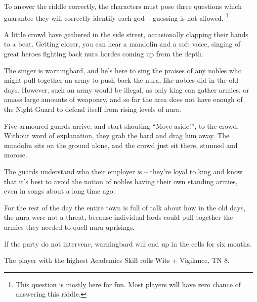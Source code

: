 \begin{multicols}{2}
To answer the riddle correctly, the characters must pose three questions which guarantee they will correctly identify each god -- guessing is not allowed.
\footnote{This question is mostly here for fun.  Most players will have zero chance of answering this riddle.}


\begin{boxtext}
	A little crowd have gathered in the side street, occasionally clapping their hands to a beat.
	Getting closer, you can hear a mandolin and a soft voice, singing of great heroes fighting back nura hordes coming up from the depth.
\end{boxtext}

The singer is \gls{warningbard}, and he's here to sing the praises of any nobles who might pull together an army to push back the nura, like nobles did in the old days.  However, such an army would be illegal, as only \gls{king} can gather armies, or amass large amounts of weaponry, and so far the area does not have enough of the Night Guard to defend itself from rising levels of nura.

\begin{boxtext}

	Five armoured guards arrive, and start shouting ``Move aside!'', to the crowd.  Without word of explanation, they grab the bard and drag him away.  The mandolin sits on the ground alone, and the crowd just sit there, stunned and morose.

\end{boxtext}

The guards understand who their employer is -- they're loyal to \gls{king} and know that it's best to avoid the notion of nobles having their own standing armies, even in songs about a long time ago.

For the rest of the day the entire town is full of talk about how in the old days, the nura were not a threat, because individual lords could pull together the armies they needed to quell nura uprisings.

If the party do not intervene, \gls{warningbard} will end up in the cells for six months.

\warningbard


The player with the highest Academics Skill rolls Wits + Vigilance, TN 8.


\end{multicols}
